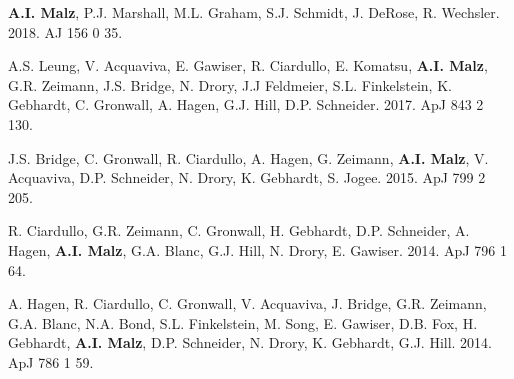 \begin{list}{\pubnumber{\therefpubnum}}{\malzlist}
\item {\bf A.I. Malz}, P.J. Marshall, %
M.L. Graham, S.J. Schmidt, J. DeRose, R. Wechsler. 
2018. AJ 156 0 35. 
  

\item A.S. Leung, V. Acquaviva, E. Gawiser, R. Ciardullo, E. Komatsu, {\bf A.I. Malz}, G.R. Zeimann, %
J.S. Bridge, N. Drory, J.J Feldmeier, S.L. Finkelstein, K. Gebhardt, C. Gronwall, A. Hagen, G.J. Hill, D.P. Schneider. 
2017. ApJ 843 2 130. 

\item J.S. Bridge, C. Gronwall, R. Ciardullo, A. Hagen, G. Zeimann, {\bf A.I. Malz}, V. Acquaviva, D.P. Schneider, N. Drory, K. Gebhardt, S. Jogee. 2015. ApJ 799 2 205. 

\item R. Ciardullo, G.R. Zeimann, C. Gronwall, H. Gebhardt, D.P. Schneider, A. Hagen, {\bf A.I. Malz}, G.A. Blanc, G.J. Hill, N. Drory, E. Gawiser. 2014. ApJ 796 1 64. 

\item A. Hagen, R. Ciardullo, C. Gronwall, V. Acquaviva, J. Bridge, G.R. Zeimann, G.A. Blanc, N.A. Bond, S.L. Finkelstein, M. Song, E. Gawiser, D.B. Fox, H. Gebhardt, {\bf A.I. Malz}, D.P. Schneider, N. Drory, K. Gebhardt, G.J. Hill. 2014. ApJ 786 1 59. 
  
\end{list}

